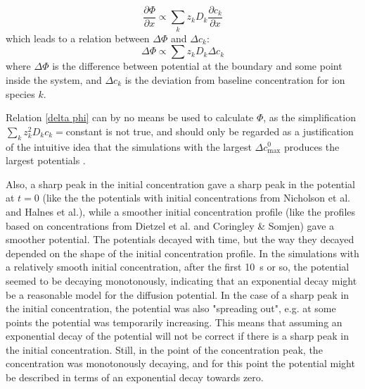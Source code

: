 \documentclass{article}
\begin{document}
\begin{equation}
 \frac{\partial \Phi}{\partial x}  \propto { \sum_k z_k D_k \frac{\partial c_k}{\partial x} }
\end{equation}
which leads to a relation between $\Delta \Phi$ and $\Delta c_k$:
\begin{equation}\label{delta phi}
 \Delta \Phi \propto \sum z_k D_k \Delta c_k
\end{equation}
where $\Delta \Phi $ is the difference between potential at the boundary and some point inside the system, and $\Delta c_k $ is the deviation from baseline concentration for ion species $k$.



Relation \ref{delta phi} can by no means be used to calculate $\Phi$, as the simplification $\sum_k z_k^2 D_k c_k =$constant is not true, and should only be regarded as a justification of the intuitive idea that the simulations with the largest $\Delta c_{\text{max}}^0$ produces the largest potentials . 



Also, a sharp peak in the initial concentration gave a sharp peak in the potential at $t=0$ (like the the potentials with initial concentrations from Nicholson et al. and Halnes et al.), while a smoother initial concentration profile (like the profiles based on concentrations from Dietzel et al. and Coringley \& Somjen) gave a smoother potential. The potentials decayed with time, but the way they decayed depended on the shape of the initial concentration profile. In the simulations with a relatively smooth initial concentration, after the first 10~s or so, the potential seemed to be decaying monotonously, indicating that an exponential decay might be a reasonable model for the diffusion potential. In the case of a sharp peak in the initial concentration, the potential was also "spreading out", e.g. at some points the potential was temporarily increasing. This means that assuming an exponential decay of the potential will not be correct if there is a sharp peak in the initial concentration. Still, in the point of the concentration peak, the concentration was monotonously decaying, and for this point the potential might be described in terms of an exponential decay towards zero. 
\end{document}
